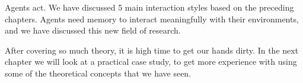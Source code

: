 Agents act. We have discussed 5 main interaction styles based on the preceding chapters. Agents need memory to interact meaningfully with their environments, and we have discussed this new field of research.

After covering so much theory, it is high time to get our hands dirty. In the next chapter we will look at a practical case study, to get more experience with using some of the theoretical concepts that we have seen. 

